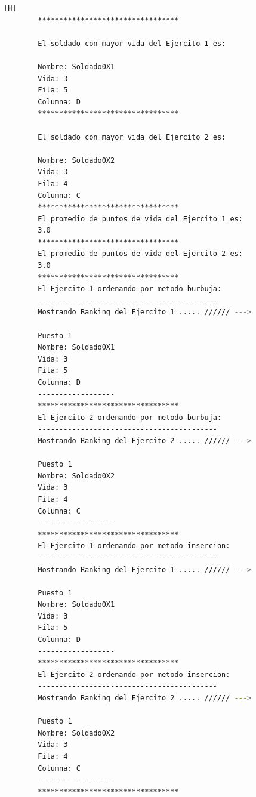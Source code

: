 \documentclass{article}
\begin{document}
	\begin{lstlisting}[language=bash,caption={Ejecucion:}][H]
		*********************************

		El soldado con mayor vida del Ejercito 1 es: 
		
		Nombre: Soldado0X1
		Vida: 3
		Fila: 5
		Columna: D
		*********************************
		
		El soldado con mayor vida del Ejercito 2 es: 
		
		Nombre: Soldado0X2
		Vida: 3
		Fila: 4
		Columna: C
		*********************************
		El promedio de puntos de vida del Ejercito 1 es: 
		3.0
		*********************************
		El promedio de puntos de vida del Ejercito 2 es: 
		3.0
		*********************************
		El Ejercito 1 ordenando por metodo burbuja: 
		------------------------------------------
		Mostrando Ranking del Ejercito 1 ..... ////// --->
		
		Puesto 1
		Nombre: Soldado0X1
		Vida: 3
		Fila: 5
		Columna: D
		------------------
		*********************************
		El Ejercito 2 ordenando por metodo burbuja: 
		------------------------------------------
		Mostrando Ranking del Ejercito 2 ..... ////// --->
		
		Puesto 1
		Nombre: Soldado0X2
		Vida: 3
		Fila: 4
		Columna: C
		------------------
		*********************************
		El Ejercito 1 ordenando por metodo insercion: 
		------------------------------------------
		Mostrando Ranking del Ejercito 1 ..... ////// --->
		
		Puesto 1
		Nombre: Soldado0X1
		Vida: 3
		Fila: 5
		Columna: D
		------------------
		*********************************
		El Ejercito 2 ordenando por metodo insercion: 
		------------------------------------------
		Mostrando Ranking del Ejercito 2 ..... ////// --->
		
		Puesto 1
		Nombre: Soldado0X2
		Vida: 3
		Fila: 4
		Columna: C
		------------------
		*********************************
		
	\end{lstlisting}
\end{document}
